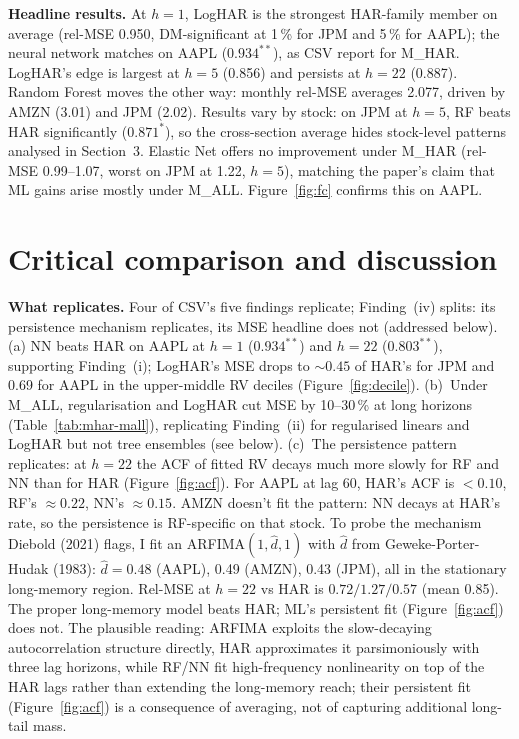 \documentclass[twocolumn,9pt]{extarticle}
\newcommand{\lead}[1]{\textbf{#1}\hspace{0.25em}\ignorespaces}
\begin{document}
\lead{Headline results.} At $h=1$, LogHAR is the strongest
HAR-family member on average (rel-MSE 0.950, DM-significant at
1\,\% for JPM and 5\,\% for AAPL); the neural network matches on
AAPL ($0.934^{**}$), as CSV report for M\_HAR. LogHAR's edge is
largest at $h=5$ (0.856) and persists at $h=22$ (0.887). Random
Forest moves the other way: monthly rel-MSE averages 2.077, driven
by AMZN (3.01) and JPM (2.02). Results vary by stock: on JPM at
$h=5$, RF beats HAR significantly ($0.871^{*}$), so the
cross-section average hides stock-level patterns analysed in
Section~3. Elastic Net offers no improvement under M\_HAR (rel-MSE
0.99--1.07, worst on JPM at 1.22, $h=5$), matching the paper's
claim that ML gains arise mostly under M\_ALL.
Figure~\ref{fig:fc} confirms this on AAPL.

\section{Critical comparison and discussion}

\lead{What replicates.} Four of CSV's five findings replicate;
Finding~(iv) splits: its persistence mechanism replicates, its MSE
headline does not (addressed below). (a) NN beats HAR on AAPL at
$h=1$ ($0.934^{**}$) and $h=22$ ($0.803^{**}$), supporting
Finding~(i); LogHAR's MSE drops to $\sim0.45$ of HAR's for JPM and
0.69 for AAPL in the upper-middle RV deciles
(Figure~\ref{fig:decile}).
(b)~Under M\_ALL, regularisation and LogHAR cut MSE by 10--30\,\% at
long horizons (Table~\ref{tab:mhar-mall}), replicating Finding~(ii) for regularised
linears and LogHAR but not tree ensembles (see below). (c)~The
persistence pattern replicates: at $h=22$ the ACF of fitted RV
decays much more slowly for RF and NN than for HAR
(Figure~\ref{fig:acf}). For AAPL at lag 60, HAR's ACF is $<0.10$,
RF's $\approx0.22$, NN's $\approx0.15$. AMZN doesn't fit the
pattern: NN decays at HAR's rate, so the persistence is RF-specific
on that stock. To probe the mechanism Diebold (2021) flags, I fit
an ARFIMA$(1,\hat{d},1)$ with $\hat{d}$ from Geweke-Porter-Hudak
(1983): $\hat{d}=0.48$ (AAPL), 0.49 (AMZN), 0.43 (JPM), all in the
stationary long-memory region. Rel-MSE at $h=22$ vs HAR is
$0.72/1.27/0.57$ (mean 0.85). The proper long-memory model beats
HAR; ML's persistent fit (Figure~\ref{fig:acf}) does not. The
plausible reading: ARFIMA exploits the slow-decaying autocorrelation
structure directly, HAR approximates it parsimoniously with three
lag horizons, while RF/NN fit high-frequency nonlinearity on top of
the HAR lags rather than extending the long-memory reach; their
persistent fit (Figure~\ref{fig:acf}) is a consequence of averaging,
not of capturing additional long-tail mass.
\end{document}
